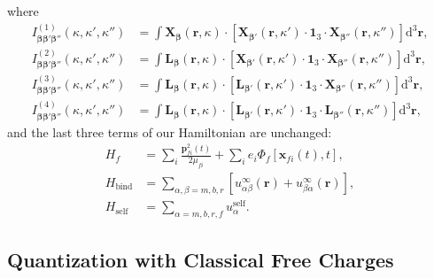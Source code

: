 \documentclass{article}
\begin{document}
where
\begin{equation}
\begin{split}
I_{\bm{\beta}\bm{\beta}'\bm{\beta}''}^{(1)}(\kappa,\kappa',\kappa'') &= \int\mathbf{X}_{\bm{\beta}}(\mathbf{r},\kappa)\cdot\left[\mathbf{X}_{\bm{\beta}'}(\mathbf{r},\kappa')\cdot\bm{1}_3\cdot\mathbf{X}_{\bm{\beta}''}(\mathbf{r},\kappa'')\right]\mathrm{d}^3\mathbf{r},\\
I_{\bm{\beta}\bm{\beta}'\bm{\beta}''}^{(2)}(\kappa,\kappa',\kappa'') &= \int\mathbf{L}_{\bm{\beta}}(\mathbf{r},\kappa)\cdot\left[\mathbf{X}_{\bm{\beta}'}(\mathbf{r},\kappa')\cdot\bm{1}_3\cdot\mathbf{X}_{\bm{\beta}''}(\mathbf{r},\kappa'')\right]\mathrm{d}^3\mathbf{r},\\
I_{\bm{\beta}\bm{\beta}'\bm{\beta}''}^{(3)}(\kappa,\kappa',\kappa'') &= \int\mathbf{L}_{\bm{\beta}}(\mathbf{r},\kappa)\cdot\left[\mathbf{L}_{\bm{\beta}'}(\mathbf{r},\kappa')\cdot\bm{1}_3\cdot\mathbf{X}_{\bm{\beta}''}(\mathbf{r},\kappa'')\right]\mathrm{d}^3\mathbf{r},\\
I_{\bm{\beta}\bm{\beta}'\bm{\beta}''}^{(4)}(\kappa,\kappa',\kappa'') &= \int\mathbf{L}_{\bm{\beta}}(\mathbf{r},\kappa)\cdot\left[\mathbf{L}_{\bm{\beta}'}(\mathbf{r},\kappa')\cdot\bm{1}_3\cdot\mathbf{L}_{\bm{\beta}''}(\mathbf{r},\kappa'')\right]\mathrm{d}^3\mathbf{r},
\end{split}
\end{equation}
and the last three terms of our Hamiltonian are unchanged:
\begin{equation}
\begin{split}
H_f &= \sum_i\frac{\mathbf{p}_{fi}^2(t)}{2\mu_{fi}} + \sum_ie_i\Phi_f[\mathbf{x}_{fi}(t),t],\\
H_\mathrm{bind} &= \sum_{\alpha,\beta = m,b,r}\left[u_{\alpha\beta}^\infty(\mathbf{r}) + u_{\beta\alpha}^\infty(\mathbf{r})\right],\\
H_\mathrm{self} &= \sum_{\alpha = m,b,r,f}u_\alpha^\mathrm{self}.
\end{split}
\end{equation}






















\newpage
\subsection{Quantization with Classical Free Charges}\label{sec:quantization}
\end{document}
